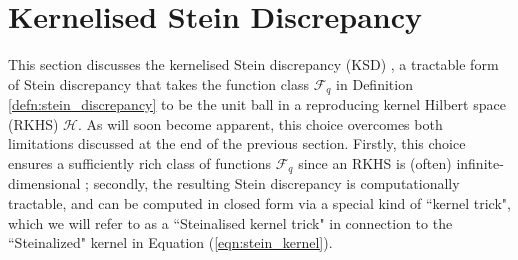 

\section{Kernelised Stein Discrepancy}
\label{section:2_ksd}

This section discusses the kernelised Stein discrepancy (KSD) \citep{liu_ksd, chwialkowski_ksd}, a tractable form of Stein discrepancy that takes the function class $\mathcal{F}_q$ in Definition \ref{defn:stein_discrepancy} to be the unit ball in a reproducing kernel Hilbert space (RKHS) $\mathcal{H}$. As will soon become apparent, this choice overcomes both limitations discussed at the end of the previous section. Firstly, this choice ensures a sufficiently rich class of functions $\mathcal{F}_q$ since an RKHS is (often) infinite-dimensional \citep{ghojogh_rkhs}; secondly, the resulting Stein discrepancy is computationally tractable, and can be computed in closed form \citep{liu_ksd} via a special kind of ``kernel trick", which we will refer to as a ``Steinalised kernel trick" in connection to the ``Steinalized" kernel \citep{liu_svgd_gf} in Equation (\ref{eqn:stein_kernel}). 


